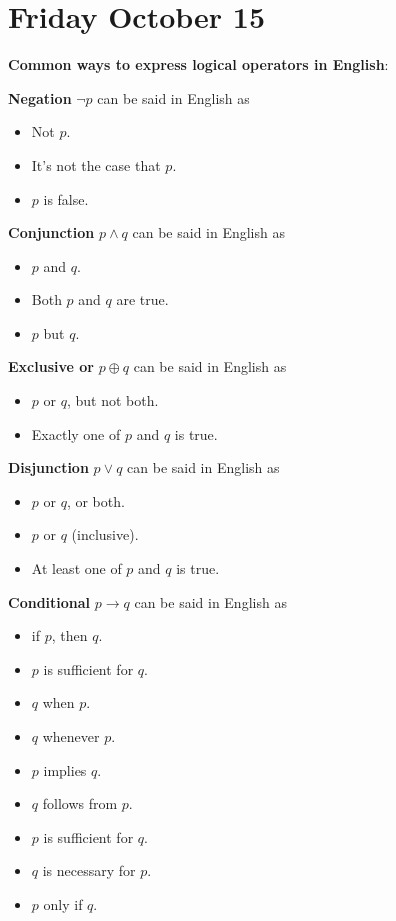 \documentclass[12pt, oneside]{article}
\begin{document}
\section*{Friday October 15}


{\bf Common ways to express logical operators in English}:

{\bf Negation} $\lnot p$ can be said in English as 

\vspace{-20pt}
\begin{itemize}
\item Not $p$.
\item It's not the case that $p$.
\item $p$ is false.
\end{itemize}

{\bf Conjunction} $p \land q$ can be said in English as

\vspace{-20pt}
\begin{itemize}
    \item $p$ and $q$.
    \item Both $p$ and $q$ are true.
    \item $p$ but $q$.
\end{itemize}

{\bf Exclusive or} $p \oplus q$ can be said in English as

\vspace{-20pt}
\begin{itemize}
    \item $p$ or $q$, but not both.
    \item Exactly one of $p$ and $q$ is true.
\end{itemize}

{\bf Disjunction} $p \lor q$ can be said in English as

\vspace{-20pt}
\begin{itemize}
    \item $p$ or $q$, or both.
    \item $p$ or $q$ (inclusive).
    \item At least one of $p$ and $q$ is true.
\end{itemize}

{\bf Conditional} $p \to q$ can be said in English as

\begin{multicols}{2}
\begin{itemize}
    \item if $p$, then $q$.
    \item $p$ is sufficient for $q$.
    \item $q$ when $p$.
    \item $q$ whenever $p$.
    \item $p$ implies $q$.
    \item $q$ follows from $p$.
    \item $p$ is sufficient for $q$.
    \item $q$ is necessary for $p$.
    \item $p$ only if $q$.
\end{itemize}
\end{multicols}
\end{document}
